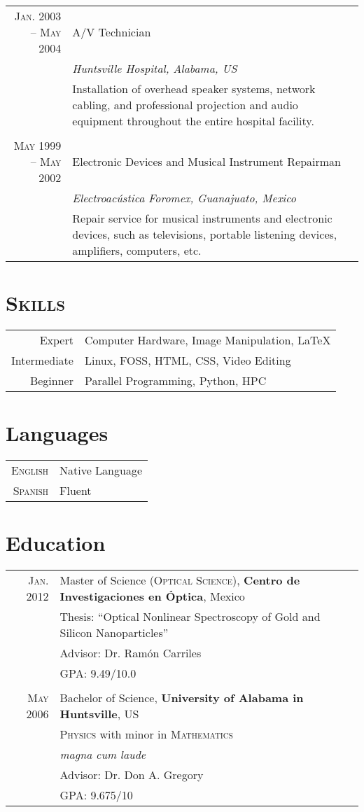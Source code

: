 \documentclass[letterpaper,10pt]{article}
\begin{document}
\begin{tabular}{r|p{11cm}}
\textsc{Jan. 2003 -- May 2004}	&	A/V Technician \\
									&	\emph{Huntsville Hospital, Alabama, US}\\
									&	\footnotesize{Installation of overhead speaker systems, network cabling, and professional projection and audio equipment throughout the entire hospital facility.}\\
									\multicolumn{2}{c}{} \\
									
\textsc{May 1999 -- May 2002}	&	Electronic Devices and Musical Instrument Repairman \\
									&	\emph{Electroacústica Foromex, Guanajuato, Mexico}\\
									&	\footnotesize{Repair service for musical instruments and electronic devices, such as televisions, portable listening devices, amplifiers, computers, etc.}
\end{tabular}

\section{\textsc{Skills}}
	\begin{tabular}{rl}
		Expert			&	Computer Hardware, Image Manipulation, \LaTeX\\ 
		Intermediate	&	Linux, FOSS, HTML, CSS, Video Editing\\
		Beginner		&	Parallel Programming, Python, HPC
	\end{tabular}

\section{Languages}
	\begin{tabular}{rl}
		\textsc{English}	&	Native Language\\
		\textsc{Spanish}	&	Fluent
	\end{tabular}

\section{Education}
\begin{tabular}{rl}	
\textsc{Jan.} 2012	&	Master of Science \textsc{(Optical Science)}, \textbf{Centro de Investigaciones en Óptica}, Mexico\\
					&	Thesis: ``Optical Nonlinear Spectroscopy of Gold and Silicon Nanoparticles''\\
					&	Advisor: Dr. Ramón Carriles\\
					&	GPA: 9.49/10.0\\
					&\\
					
\textsc{May} 2006	&	Bachelor of Science, \textbf{University of Alabama in Huntsville}, US\\
					&	\textsc{Physics} with minor in \textsc{Mathematics}\\
					&	\small\emph{magna cum laude}\\
					&	Advisor: Dr. Don A. Gregory\\
					&	\normalsize GPA: 9.675/10
\end{tabular}
\end{document}
